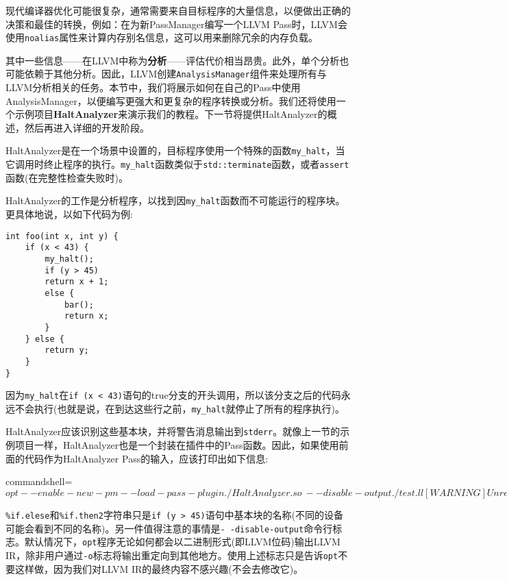 
现代编译器优化可能很复杂，通常需要来自目标程序的大量信息，以便做出正确的决策和最佳的转换，例如：在为新PassManager编写一个LLVM Pass时，LLVM会使用\texttt{noalias}属性来计算内存别名信息，这可以用来删除冗余的内存负载。

其中一些信息——在LLVM中称为\textbf{分析}——评估代价相当昂贵。此外，单个分析也可能依赖于其他分析。因此，LLVM创建\texttt{AnalysisManager}组件来处理所有与LLVM分析相关的任务。本节中，我们将展示如何在自己的Pass中使用AnalysisManager，以便编写更强大和更复杂的程序转换或分析。我们还将使用一个示例项目\textbf{HaltAnalyzer}来演示我们的教程。下一节将提供HaltAnalyzer的概述，然后再进入详细的开发阶段。


HaltAnalyzer是在一个场景中设置的，目标程序使用一个特殊的函数\texttt{my\_halt}，当它调用时终止程序的执行。\texttt{my\_halt}函数类似于\texttt{std::terminate}函数，或者\texttt{assert}函数(在完整性检查失败时)。

HaltAnalyzer的工作是分析程序，以找到因\texttt{my\_halt}函数而不可能运行的程序块。更具体地说，以如下代码为例:

\begin{lstlisting}[style=styleCXX]
int foo(int x, int y) {
	if (x < 43) {
		my_halt();
		if (y > 45)
		return x + 1;
		else {
			bar();
			return x;
		}
	} else {
		return y;
	}
}
\end{lstlisting}

因为\texttt{my\_halt}在\texttt{if (x < 43)}语句的true分支的开头调用，所以该分支之后的代码永远不会执行(也就是说，在到达这些行之前，\texttt{my\_halt}就停止了所有的程序执行)。

HaltAnalyzer应该识别这些基本块，并将警告消息输出到\texttt{stderr}。就像上一节的示例项目一样，HaltAnalyzer也是一个封装在插件中的Pass函数。因此，如果使用前面的代码作为HaltAnalyzer Pass的输入，应该打印出如下信息:

\begin{tcblisting}{commandshell={}}
$ opt --enable-new-pm --load-pass-plugin ./HaltAnalyzer.so \
      --disable-output ./test.ll
[WARNING] Unreachable BB: label %
[WARNING] Unreachable BB: label %
$
\end{tcblisting}

\texttt{\%if.elese}和\texttt{\%if.then2}字符串只是\texttt{if (y > 45)}语句中基本块的名称(不同的设备可能会看到不同的名称)。另一件值得注意的事情是\texttt{-\,-disable-output}命令行标志。默认情况下，\texttt{opt}程序无论如何都会以二进制形式(即LLVM位码)输出LLVM IR，除非用户通过\texttt{-o}标志将输出重定向到其他地方。使用上述标志只是告诉\texttt{opt}不要这样做，因为我们对LLVM IR的最终内容不感兴趣(不会去修改它)。

